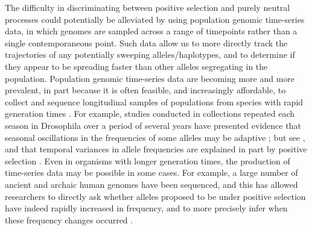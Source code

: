 The difficulty in discriminating between positive selection and purely neutral processes could potentially be alleviated by using population genomic time-series data, in which genomes are sampled across a range of timepoints rather than a single contemporaneous point. Such data allow us to more directly track the trajectories of any potentially sweeping alleles/haplotypes, and to determine if they appear to be spreading faster than other alleles segregating in the population. Population genomic time-series data are becoming more and more prevalent, in part because it is often feasible, and increasingly affordable, to collect and sequence longitudinal samples of populations from species with rapid generation times \cite{berglandGenomicEvidenceRapid2014,federClarifyingRoleTime2021,machadoBroadGeographicSampling2021,penningsLossRecoveryGenetic2014}. For example, studies conducted in collections repeated each season in Drosophila over a period of several years have presented evidence that seasonal oscillations in the frequencies of some alleles may be adaptive \cite{berglandGenomicEvidenceRapid2014}; but see \cite{buffaloEstimatingGenomewideContribution2020}, and that temporal variances in allele frequencies are explained in part by positive selection \cite{bertramAlleleFrequencyDivergence2021}. Even in organisms with longer generation times, the production of time-series data may be possible in some cases. For example, a large number of ancient and archaic human genomes have been sequenced, and this has allowed researchers to directly ask whether alleles proposed to be under positive selection have indeed rapidly increased in frequency, and to more precisely infer when these frequency changes occurred \cite{bollbackEstimation2NesTemporal2008,enardGenomewideSignalsPositive2014,hummelDetectionCCR5D32HIV2005,jeongchoongwonLongtermGeneticStability2016,malaspinasMethodsCharacterizeSelective2016,olaldeGenomicHistoryIberian2019,sverrisdottirDirectEstimatesNatural2014,wildeDirectEvidencePositive2014}. 

